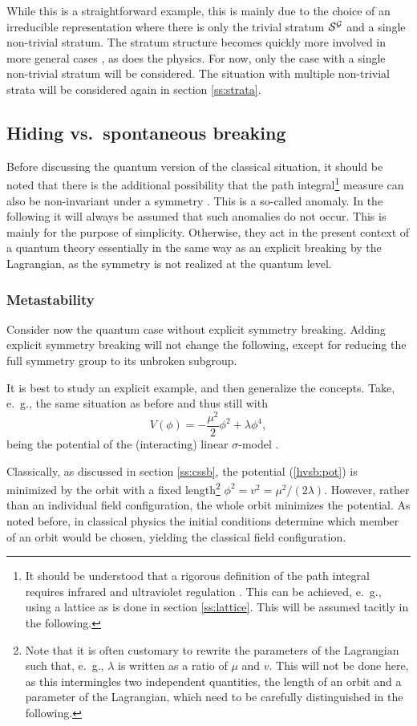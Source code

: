 \documentclass[final,12pt,3p,longtitle]{elsarticle}
\newcommand*{\no}{\noindent}
\newcommand*{\be}{\begin{equation}}
\newcommand*{\ee}{\end{equation}}
\newcommand*{\pref}[1]{(\ref{#1})}
\newcommand*{\1}{1\!\!\!\bot}
\begin{document}
While this is a straightforward example, this is mainly due to the choice of an irreducible representation where there is only the trivial stratum ${\cal S}^{\cal G}$ and a single non-trivial stratum. The stratum structure becomes quickly more involved in more general cases \cite{O'Raifeartaigh:1978kv}, as does the physics. For now, only the case with a single non-trivial stratum will be considered. The situation with multiple non-trivial strata will be considered again in section \ref{ss:strata}.

\subsection{Hiding vs.\ spontaneous breaking}\label{s:hidssb}

Before discussing the quantum version of the classical situation, it should be noted that there is the additional possibility that the path integral\footnote{It should be understood that a rigorous definition of the path integral requires infrared and ultraviolet regulation \cite{Seiler:1982pw,Rivers:1987hi}. This can be achieved, e.\ g., using a lattice as is done in section \ref{ss:lattice}. This will be assumed tacitly in the following.} measure can also be non-invariant under a symmetry \cite{Bohm:2001yx,Bertlmann:1996xk}. This is a so-called anomaly. In the following it will always be assumed that such anomalies do not occur. This is mainly for the purpose of simplicity. Otherwise, they act in the present context of a quantum theory essentially in the same way as an explicit breaking by the Lagrangian, as the symmetry is not realized at the quantum level.

\subsubsection{Metastability}

Consider now the quantum case \cite{O'Raifeartaigh:1978kv,Sartori:1992ib} without explicit symmetry breaking. Adding explicit symmetry breaking will not change the following, except for reducing the full symmetry group to its unbroken subgroup.

It is best to study an explicit example, and then generalize the concepts. Take, e.\ g., the same situation as before and thus still with
\be
V(\phi)=-\frac{\mu^2}{2}\phi^2+\lambda\phi^4\label{hvsb:pot},
\ee
\no being the potential of the (interacting) linear $\sigma$-model \cite{Bohm:2001yx}.

Classically, as discussed in section \ref{ss:cssb}, the potential \pref{hvsb:pot} is minimized by the orbit with a fixed length\footnote{Note that it is often customary to rewrite the parameters of the Lagrangian such that, e.\ g., $\lambda$ is written as a ratio of $\mu$ and $v$. This will not be done here, as this intermingles two independent quantities, the length of an orbit and a parameter of the Lagrangian, which need to be carefully distinguished in the following.} $\phi^2=v^2=\mu^2/(2\lambda)$. However, rather than an individual field configuration, the whole orbit minimizes the potential. As noted before, in classical physics the initial conditions determine which member of an orbit would be chosen, yielding the classical field configuration.
\end{document}
